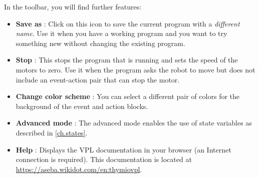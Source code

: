 
In the toolbar, you will find further features:

\begin{itemize}

\item \textbf{Save as} :
Click on this icon to save the current program with a \emph{different name}.
Use it when you have a working program and you want to try something new without changing the existing program.

\item \textbf{Stop} : This stops the program that is running
and sets the speed of the motors to zero. Use it when the program asks
the robot to move but does not include an event-action pair that can
stop the motor.

\item \textbf{Change color scheme} : You can select a
different pair of colors for the background of the event and action blocks.

\item \textbf{Advanced mode} : The advanced mode enables
the use of state variables as described in \cref{ch.states}.

\item \textbf{Help} : Displays the VPL documentation in
your browser (an Internet connection is required).
This documentation is located at
\url{https://aseba.wikidot.com/en:thymiovpl}.

\end{itemize}


